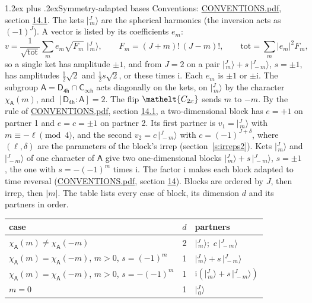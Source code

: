 \documentclass[10pt,a4paper]{article}
\makeatletter
\renewcommand\section{\@startsection{section}{1}{\z@}{-3ex plus -1ex minus -.2ex}%
  {1.2ex plus .2ex}{\normalfont\large\sffamily\bfseries\color{parttitle}}}
\numberwithin{equation}{section}
\newcommand{\eltfont}[1]{{\let\sigma\eltsigma\mathelt{#1}}}
\newcommand{\grp}[1]{\mathsf{#1}}
\newcommand{\elt}[1]{\eltfont{#1}}
\newcommand{\grpindex}[2]{[#1 : #2]}
\newcommand{\iunit}{\mathrm{i}}
\newcommand{\chiA}{\chi_{\grp{A}}}
\newcommand{\jm}[2]{\bigl\lvert{}^{#1}_{\,#2}\bigr\rangle}
\makeatother
\begin{document}
\section{Symmetry-adapted bases}\label{s:bases}
Conventions: \href{../../CONVENTIONS.pdf}{CONVENTIONS.pdf}, section \href{../../CONVENTIONS.pdf\#conv.14.1}{14.1}.
\leavevmode\label{n:index.m}\label{n:vector.ket}The kets $\jm{J}{m}$ are the spherical harmonics (the inversion acts as $(-1)^J$). \label{n:index.ketcoefficient}\label{n:vector.basis.symmetry}\label{n:index.ketweight}\label{n:index.total}A vector is listed by its coefficients $e_m$:
\begin{equation}\label{e:ket}v = \frac{1}{\sqrt{\mathrm{tot}}}\sum_m e_m\sqrt{F_m}\;\jm{J}{m},\qquad F_m = (J+m)!\,(J-m)!,\qquad \mathrm{tot} = \sum_m |e_m|^2F_m,\end{equation}
\leavevmode\label{n:index.pair.sign}so a single ket has amplitude $\pm1$, and from $J = 2$ on a pair $\jm{J}{m} + s\,\jm{J}{-m}$, $s = \pm1$, has amplitudes $\tfrac{1}{2}\sqrt{2}$ and $\tfrac{1}{2}s\sqrt{2}$, or these times $\iunit$. Each $e_m$ is $\pm1$ or $\pm\iunit$.
\leavevmode\label{n:group.A}\label{n:function.character.abelian}The subgroup $\grp{A} = \grp{D_{4h}}\cap\grp{C_{\infty h}}$ acts diagonally on the kets, on $\jm{J}{m}$ by the character $\chiA(m)$, and $\grpindex{\grp{D_{4h}}}{\grp{A}} = 2$. The flip $\elt{C_{2x}}$ sends $m$ to $-m$. \label{n:index.partner.sign}By the rule of \href{../../CONVENTIONS.pdf}{CONVENTIONS.pdf}, section \href{../../CONVENTIONS.pdf\#conv.14.1}{14.1}, a two-dimensional block has $e = +1$ on partner 1 and $e = c = \pm1$ on partner 2. Its first partner is $v_1 = \jm{J}{m}$ with $m \equiv -\ell \pmod{4}$, and the second $v_2 = c\,\jm{J}{-m}$ with $c = (-1)^{J+\delta}$, where $(\ell, \delta)$ are the parameters of the block's irrep (section~\ref{s:irreps2}). Kets $\jm{J}{m}$ and $\jm{J}{-m}$ of one character of $\grp{A}$ give two one-dimensional blocks $\jm{J}{m} + s\,\jm{J}{-m}$, $s = \pm1$, the one with $s = -(-1)^m$ times $\iunit$. The factor $\iunit$ makes each block adapted to time reversal (\href{../../CONVENTIONS.pdf}{CONVENTIONS.pdf}, section \href{../../CONVENTIONS.pdf\#conv.14}{14}). Blocks are ordered by $J$, then irrep, then $|m|$.
\leavevmode\label{n:head.case}\label{n:head.partners}The table lists every case of block, its dimension $d$ and its partners in order.
\begin{center}\begin{tabular}{@{}lrl@{}}\toprule
case & $d$ & partners\\\midrule
$\chiA(m) \ne \chiA(-m)$ & 2 & $\jm{J}{m}$;\ $c\,\jm{J}{-m}$\\
$\chiA(m) = \chiA(-m)$, $m > 0$, $s = (-1)^m$ & 1 & $\jm{J}{m} + s\,\jm{J}{-m}$\\
$\chiA(m) = \chiA(-m)$, $m > 0$, $s = -(-1)^m$ & 1 & $\iunit(\jm{J}{m} + s\,\jm{J}{-m})$\\
$m = 0$ & 1 & $\jm{J}{0}$\\
\bottomrule\end{tabular}\end{center}
\end{document}
